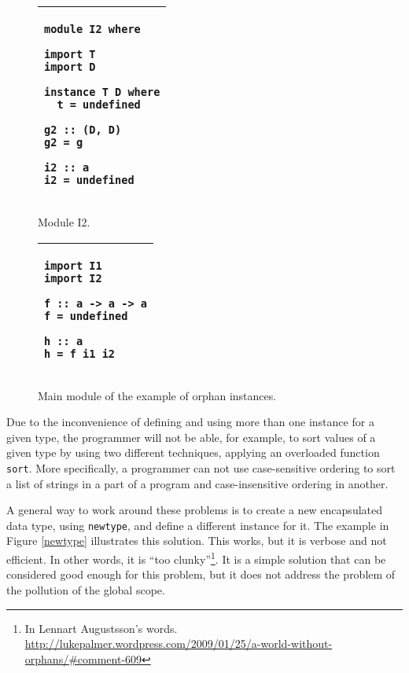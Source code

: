\documentclass[msc]{ppgccufmg}
\begin{document}
\begin{figure}
\caption{Module I2.\label{I2}}
\begin{tabular}{|p{\textwidth}|}
\hline
\begin{verbatim}
module I2 where

import T
import D

instance T D where
  t = undefined

g2 :: (D, D)
g2 = g

i2 :: a
i2 = undefined
\end{verbatim}
\\
\hline
\end{tabular}
\end{figure}

\begin{figure}
\caption{Main module of the example of orphan instances.\label{main}}
\begin{tabular}{|p{\textwidth}|}
\hline
\begin{verbatim}
import I1
import I2

f :: a -> a -> a
f = undefined

h :: a
h = f i1 i2
\end{verbatim}
\\
\hline
\end{tabular}
\end{figure}

Due to the inconvenience of defining and using more than one instance for a given type,
the programmer will not be able, for example, to sort values of a given type by using two
different techniques, applying an overloaded function \texttt{sort}.  More specifically, a
programmer can not use case-sensitive ordering to sort a list of strings in a part of a
program and case-insensitive ordering in another.

A general way to work around these problems is to create a new encapsulated data type, using \texttt{newtype}, and define a different instance for it.
The example in Figure \ref{newtype} illustrates this solution.  This works, but
it is verbose and not efficient.  In other words, it is ``too
clunky''\footnote{In Lennart Augustsson's
  words. \url{http://lukepalmer.wordpress.com/2009/01/25/a-world-without-orphans/\#comment-609}}.  It is a simple solution that can be considered good enough
for this problem, but it does not address the problem of the pollution of the global
scope.
\end{document}

